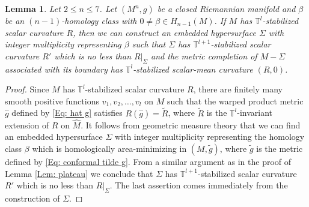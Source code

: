 \documentclass[11pt,letterpaper]{amsart}
\numberwithin{equation}{section}
\newtheorem{lemma}[theorem]{Lemma}
\theoremstyle{definition}
\begin{document}
\begin{lemma}\label{Lem: homology minimizing}
Let $2\leq n\leq 7$. Let $(M^n,g)$ be a closed Riemannian manifold and $\beta$ be an $(n-1)$-homology class with $0 \neq \beta\in H_{n-1}(M)$. If $M$ has $\mathbb T^l$-stabilized scalar curvature $R$, then we can construct an embedded hypersurface $\Sigma$ with integer multiplicity representing $\beta$ such that $\Sigma$ has $\mathbb T^{l+1}$-stabilized scalar curvature $R'$ which is no less than $R|_\Sigma$ and the metric completion of $M-\Sigma$ associated with its boundary has $\mathbb T^{l}$-stabilized scalar-mean curvature $(R,0)$.
\end{lemma}
\begin{proof}
Since $M$ has $\mathbb T^l$-stabilized scalar curvature $R$, there are finitely many smooth positive functions $v_1,v_2,\ldots, v_l$ on $M$ such that the warped product metric $\hat g$ defined by \eqref{Eq: hat g}
satisfies $R(\hat g)=\tilde R$, where $\tilde R$ is the $\mathbb T^l$-invariant extension of $R$ on $\hat M$.
It follows from geometric measure theory that we can find an embedded hypersurface $\Sigma$ with integer multiplicity representing the homology class $\beta$ which is homologically area-minimizing in $(M,\tilde g)$, where $\tilde g$ is the metric defined by \eqref{Eq: conformal tilde g}.
From a similar argument as in the proof of Lemma \ref{Lem: plateau} we conclude that $\Sigma$ has $\mathbb T^{l+1}$-stabilized scalar curvature $R'$ which is no less than $R|_\Sigma$. The last assertion comes immediately from the construction of $\Sigma$.
\end{proof}
\end{document}
